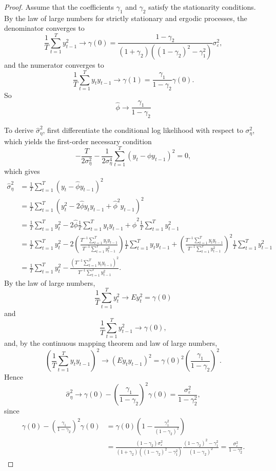 \documentclass[oneside,reqno]{amsart}
\newcommand{\eps}{\varepsilon}
\theoremstyle{definition}
\begin{document}
\begin{enumerate}
\begin{proof}
Assume that the coefficients $\gamma_1$ and $\gamma_2$ satisfy the stationarity conditions. By the law of large numbers for strictly stationary and ergodic processes, the denominator converges to 
\[
	\frac{1}{T} \sum_{t=1}^Ty_{t-1}^2 \to  \gamma(0) = \frac{1-\gamma_2}{(1 + \gamma_2)((1-\gamma_2)^2 - \gamma_1^2)}\sigma_\eps^2,
\]
and the numerator converges to
\[
	\frac{1}{T}\sum_{t=1}^T y_t y_{t-1} \to \gamma(1) = \frac{\gamma_1}{1-\gamma_2}\gamma(0).
\]
So 
\[
	\hat \phi \to \frac{\gamma_1}{1-\gamma_2}
\]
\par
To derive $\hat \sigma_\eta^2$, first differentiate the conditional log likelihood with respect to $\sigma_\eta^2$, which yields the first-order necessary condition
\[
	-\frac{T}{2\sigma_\eta^2} - \frac{1}{2 \sigma_\eta^4} \sum_{t=1}^T (y_t- \phi y_{t-1})^2 = 0,
\]
which gives
\begin{align*}
	\hat \sigma_\eta^2 &= \frac{1}{T}\sum_{t=1}^T (y_t- \hat \phi y_{t-1})^2  \\
	&= \frac{1}{T}\sum_{t=1}^T (y_t^2- 2\hat \phi y_t y_{t-1} + \hat \phi^2 y_{t-1})^2 \\
	&= \frac{1}{T}\sum_{t=1}^T y_t^2- 2\hat \phi \frac{1}{T}\sum_{t=1}^T y_t y_{t-1} + \hat \phi^2 \frac{1}{T}\sum_{t=1}^T y_{t-1}^2 \\
	&= \frac{1}{T} \sum_{t=1}^T y_t^2 - 2 \left(\frac{T^{-1} \sum_{t=1}^T y_t y_{t-1}}{T^{-1} \sum_{t=1}^T y_{t-1}^2}\right)  \frac{1}{T}\sum_{t=1}^T y_t y_{t-1} + \left( \frac{T^{-1} \sum_{t=1}^T y_t y_{t-1}}{T^{-1} \sum_{t=1}^T y_{t-1}^2} \right)^2 \frac{1}{T}\sum_{t=1}^T y_{t-1}^2 \\
	&= \frac{1}{T} \sum_{t=1}^T y_t^2 - \frac{(T^{-1} \sum_{t=1}^T y_t y_{t-1})^2}{T^{-1} \sum_{t=1}^T y_{t-1}^2}. 
\end{align*}	
By the law of large numbers,
\[
	\frac{1}{T} \sum_{t=1}^T y_t^2 \to E y_t^2 = \gamma(0)
\]
and
\[
	\frac{1}{T} \sum_{t=1}^T y_{t-1}^2 \to \gamma(0),
\]
and, by the continuous mapping theorem and law of large numbers,
\[
	\left(\frac{1}{T}\sum_{t=1}^T y_t y_{t-1} \right)^2 \to (E y_ty_{t-1})^2 
	= \gamma(0)^2 \left(\frac{\gamma_1}{1 - \gamma_2}\right)^2.
\]
Hence
\[
	\hat \sigma_\eta^2 \to \gamma(0) -  \left(\frac{\gamma_1}{1 - \gamma_2}\right)^2\gamma(0) 
	= \frac{\sigma_\eps^2}{1-\gamma_2^2}, 
\]
since
\begin{align*}
	\gamma(0) -  \left(\frac{\gamma_1}{1 - \gamma_2}\right)^2\gamma(0) 
	&= \gamma(0) \left(1-\frac{\gamma_1^2}{(1 - \gamma_2)^2}\right) \\
	&= \frac{(1-\gamma_2)\sigma_\eps^2}{(1 + \gamma_2)((1-\gamma_2)^2 - \gamma_1^2)} \frac{(1-\gamma_2)^2- \gamma_1^2}{(1-\gamma_2)^2}  
	= \frac{\sigma_\eps^2}{1-\gamma_2^2}.
\end{align*}
\end{proof}
\end{enumerate}
\end{document}
